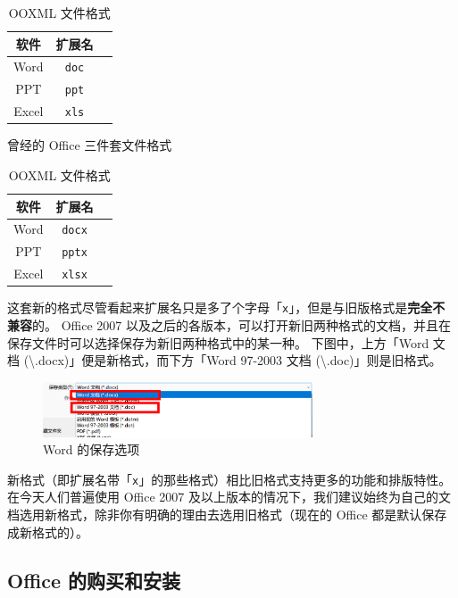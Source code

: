 \begin{table}[htb!]
  \begin{minipage}{7.5cm}
    \centering\begin{tabular}{ccc}
      \toprule
      软件 & 扩展名 \\
      \midrule
      Word & \verb|doc| \\
      PPT & \verb|ppt| \\
      Excel & \verb|xls| \\
      \bottomrule
    \end{tabular}
    \caption{曾经的 Office 三件套文件格式}
    \label{Old_Office_File_Format}
  \end{minipage}
  \begin{minipage}{6cm}
    \centering\begin{tabular}{ccc}
      \toprule
      软件 & 扩展名 \\
      \midrule
      Word & \verb|docx| \\
      PPT & \verb|pptx| \\
      Excel & \verb|xlsx| \\
      \bottomrule
    \end{tabular}
    \caption{OOXML 文件格式}
    \label{OOXML_File_Format}
  \end{minipage}
\end{table}

这套新的格式尽管看起来扩展名只是多了个字母「\verb|x|」，但是与旧版格式是\textbf{完全不兼容}的。
Office 2007 以及之后的各版本，可以打开新旧两种格式的文档，并且在保存文件时可以选择保存为新旧两种格式中的某一种。
下图中，上方「Word 文档 (\textbackslash\*.docx)」便是新格式，而下方「Word 97-2003 文档 (\textbackslash\*.doc)」则是旧格式。

\begin{figure}[htb!]
  \centering
  \includegraphics[width=8cm]{assets/Word_formats.png}
  \caption{Word 的保存选项}
  \label{Word_Formats}
\end{figure}

新格式（即扩展名带「\verb|x|」的那些格式）相比旧格式支持更多的功能和排版特性。
在今天人们普遍使用 Office 2007 及以上版本的情况下，我们建议始终为自己的文档选用新格式，除非你有明确的理由去选用旧格式（现在的 Office 都是默认保存成新格式的）。

\subsection{Office 的购买和安装}

